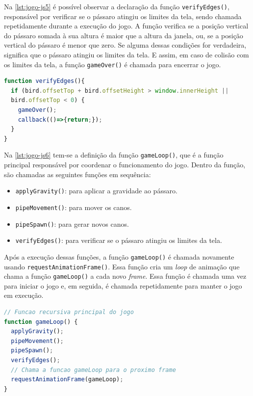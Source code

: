 Na \autoref{lst:jogo-js5} é possível observar a declaração da função \texttt{verifyEdges()}, responsável por verificar se o pássaro atingiu os limites da tela, sendo chamada repetidamente durante a execução do jogo. A função verifica se a posição vertical do pássaro somada à sua altura é maior que a altura da janela, ou, se a posição vertical do pássaro é menor que zero. Se alguma dessas condições for verdadeira, significa que o pássaro atingiu os limites da tela. E assim, em caso de colisão com os limites da tela, a função \texttt{gameOver()} é chamada para encerrar o jogo.

\Needspace{0.3\textheight}
\begin{lstlisting}[language=TypeScript, caption={Projeto exemplo em JS (Parte 5): Função de verificação de bordas da tela}, label=lst:jogo-js5]
function verifyEdges(){
  if (bird.offsetTop + bird.offsetHeight > window.innerHeight ||
  bird.offsetTop < 0) {
    gameOver();
    callback(()=>{return;});
  }
}
\end{lstlisting}


Na \autoref{lst:jogo-js6} tem-se a definição da função \texttt{gameLoop()}, que é a função principal responsável por coordenar o funcionamento do jogo. Dentro da função, são chamadas as seguintes funções em sequência:
\begin{itemize}
    \item \texttt{applyGravity()}: para aplicar a gravidade ao pássaro.

    \item \texttt{pipeMovement()}: para mover os canos.

    \item \texttt{pipeSpawn()}: para gerar novos canos.

    \item \texttt{verifyEdges()}: para verificar se o pássaro atingiu os limites da tela.
\end{itemize}

Após a execução dessas funções, a função \texttt{gameLoop()} é chamada novamente usando \texttt{requestAnimationFrame()}. Essa função cria um \textit{loop} de animação que chama a função \texttt{gameLoop()} a cada novo \textit{frame}. Essa função é chamada uma vez para iniciar o jogo e, em seguida, é chamada repetidamente para manter o jogo em execução.


\begin{lstlisting}[language=TypeScript, caption={Projeto exemplo em JS (Parte 6): Função de \textit{loop} principal do jogo}, label=lst:jogo-js6]
// Funcao recursiva principal do jogo
function gameLoop() {
  applyGravity();
  pipeMovement();  
  pipeSpawn();
  verifyEdges();
  // Chama a funcao gameLoop para o proximo frame
  requestAnimationFrame(gameLoop);
}
\end{lstlisting}

